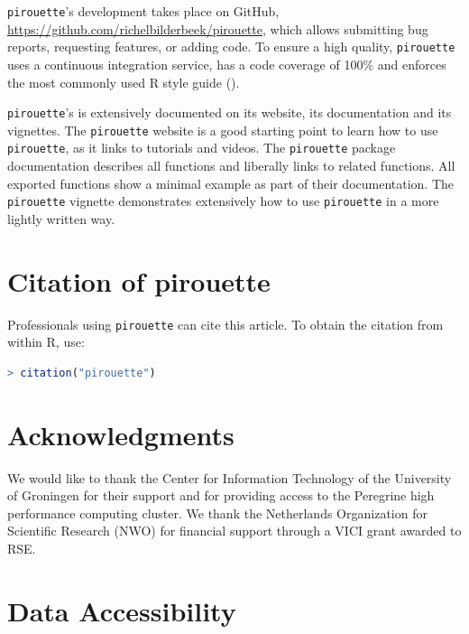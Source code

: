 \documentclass{article}
\begin{document}
\verb;pirouette;'s development takes place on GitHub,
\url{https://github.com/richelbilderbeek/pirouette},
which allows submitting bug reports, requesting features, 
or adding code. To ensure a high quality, \verb;pirouette; 
uses a continuous integration service, has a code coverage of 100\%
and enforces the most commonly used R style guide (\cite{style_guide}).

\verb;pirouette;'s is extensively documented on its website,
its documentation and its vignettes.
The \verb;pirouette; website is a good starting point to learn
how to use \verb;pirouette;, as it links to tutorials and videos.
The \verb;pirouette; package documentation describes
all functions and liberally links to related functions.
All exported functions show a minimal example as part of their documentation.
The \verb;pirouette; vignette demonstrates extensively how 
to use \verb;pirouette; in a more lightly written way. 

\section{Citation of pirouette}

Professionals using \verb;pirouette; can cite this
article. To obtain the citation from within R, use:

\begin{lstlisting}[language=R]
> citation("pirouette")
\end{lstlisting}

\section{Acknowledgments}

We would like to thank the Center for Information Technology of the University 
of Groningen for their support and for providing access to the Peregrine 
high performance computing cluster. 
We thank the Netherlands 
Organization for Scientific Research (NWO) for financial support 
through a VICI grant awarded to RSE.

\section{Data Accessibility}
\end{document}
